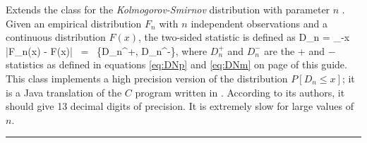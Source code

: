 
Extends the class  for the
 {\em Kolmogorov-Smirnov\/} distribution with parameter $n$ \cite{tDUR73a}.
Given an empirical distribution $F_n$ with $n$ independent observations and
a continuous distribution $F(x)$, the two-sided \ks{} statistic is defined as
\eq
D_n = \sup_{-\infty\le x \le \infty} |F_n(x) - F(x)| \ = \
   \max\{D_n^+, D_n^-\},
\endeq
where $D_n^+$ and $D_n^-$ are the \ks+ and \ks$-$ statistics as defined in
equations \ref{eq:DNp} and \ref{eq:DNm} on page \pageref{eq:DNp} of this guide.
This class implements a high precision version of the \ks{}
 distribution $P[D_n \le x]$; it is a Java translation of the $C$ program
written in \cite{tMAR03a}.  According to its authors, it should give
 13 decimal digits of precision. It is extremely slow
 for large values of $n$.


\bigskip\hrule

